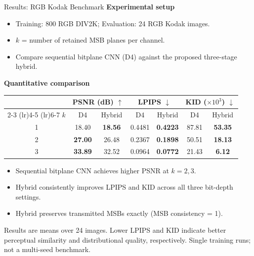 \documentclass[aspectratio=169, 11pt]{beamer}
\begin{document}
\begin{frame}{Results: RGB Kodak Benchmark}
    \small
    \textbf{Experimental setup}
    \begin{itemize}
        \item Training: 800 RGB DIV2K; Evaluation: 24 RGB Kodak images.
        \item $k$ = number of retained MSB planes per channel.
        \item Compare sequential bitplane CNN (D4) against the proposed three-stage hybrid.
    \end{itemize}

    \vspace{0.1cm}
    \textbf{Quantitative comparison}
    \begin{table}
        \centering
        \setlength{\tabcolsep}{5pt}
        \begin{tabular}{c cc cc cc}
            \toprule
            & \multicolumn{2}{c}{\textbf{PSNR (dB)} $\uparrow$}
            & \multicolumn{2}{c}{\textbf{LPIPS} $\downarrow$}
            & \multicolumn{2}{c}{\textbf{KID ($\times 10^3$)} $\downarrow$}
            \\
            \cmidrule(lr){2-3}
            \cmidrule(lr){4-5}
            \cmidrule(lr){6-7}
            $k$ & D4 & Hybrid & D4 & Hybrid & D4 & Hybrid \\
            \midrule
            1 & 18.40 & \textbf{18.56} & 0.4481 & \textbf{0.4223} & 87.81 & \textbf{53.35} \\

            2 & \textbf{27.00} & 26.48 & 0.2367 & \textbf{0.1898} & 50.51 & \textbf{18.13} \\

            3 & \textbf{33.89} & 32.52 & 0.0964 & \textbf{0.0772} & 21.43 & \textbf{6.12} \\
            \bottomrule
        \end{tabular}
    \end{table}

    \vspace{0.2cm}
    \begin{itemize}
        \item Sequential bitplane CNN achieves higher PSNR at $k=2,3$.
        \item Hybrid consistently improves LPIPS and KID across all three bit-depth settings.
        \item Hybrid preserves transmitted MSBs exactly (MSB consistency = 1).
    \end{itemize}

    \vspace{0.1cm}
    \footnotesize
    Results are means over 24 images. Lower LPIPS and KID indicate better perceptual similarity and distributional quality, respectively. Single training runs; not a multi-seed benchmark.
\end{frame}
\end{document}
